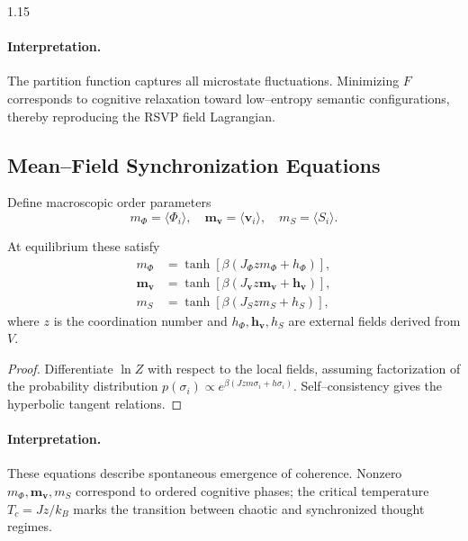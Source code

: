 \documentclass[12pt,a4paper]{article}
\begin{document}
\begin{spacing}{1.15}
\paragraph{Interpretation.}
The partition function captures all microstate fluctuations.
Minimizing $F$ corresponds to cognitive relaxation
toward low–entropy semantic configurations,
thereby reproducing the RSVP field Lagrangian.

\subsection{Mean–Field Synchronization Equations}

\begin{definition}
\label{def:order}
Define macroscopic order parameters
\[
m_\Phi = \langle \Phi_i\rangle,\quad
\mathbf{m}_{\mathbf{v}} = \langle \mathbf{v}_i\rangle,\quad
m_S = \langle S_i\rangle.
\]
\end{definition}

\begin{theorem}
\label{thm:mf}
At equilibrium these satisfy
\[
\begin{aligned}
m_\Phi &= \tanh[\beta(J_\Phi z m_\Phi + h_\Phi)],\\
\mathbf{m}_{\mathbf{v}} &= \tanh[\beta(J_{\mathbf{v}} z \mathbf{m}_{\mathbf{v}} + \mathbf{h}_{\mathbf{v}})],\\
m_S &= \tanh[\beta(J_S z m_S + h_S)],
\end{aligned}
\]
where $z$ is the coordination number
and $h_\Phi,\mathbf{h}_{\mathbf{v}},h_S$
are external fields derived from $V$.
\end{theorem}

\begin{proof}
Differentiate $\ln Z$ with respect to the local fields,
assuming factorization of the probability distribution
$p(\sigma_i)\propto e^{\beta(Jz m \sigma_i + h\sigma_i)}$.
Self–consistency gives the hyperbolic tangent relations.
\end{proof}

\paragraph{Interpretation.}
These equations describe spontaneous emergence of coherence.
Nonzero $m_\Phi,\mathbf{m}_{\mathbf{v}},m_S$
correspond to ordered cognitive phases;
the critical temperature $T_c\!=\!J z/k_B$
marks the transition between chaotic and synchronized thought regimes.


\end{spacing}
\end{document}
